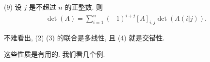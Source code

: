 \documentclass[../libro.tex]{subfiles}
\begin{document}
(9)
设 \(j\) 是不超过 \(n\) 的正整数.
则
\begin{align*}
    \det {(A)} = \sum_{i = 1}^{n}
    {(-1)^{i+j} [A]_{i,j} \det {(A(i|j))}}.
\end{align*}

\vspace{2ex}

不难看出, (2) (3) 的联合是多线性,
且 (4) 就是交错性.


这些性质是有用的.
我们看几个例.
\end{document}
